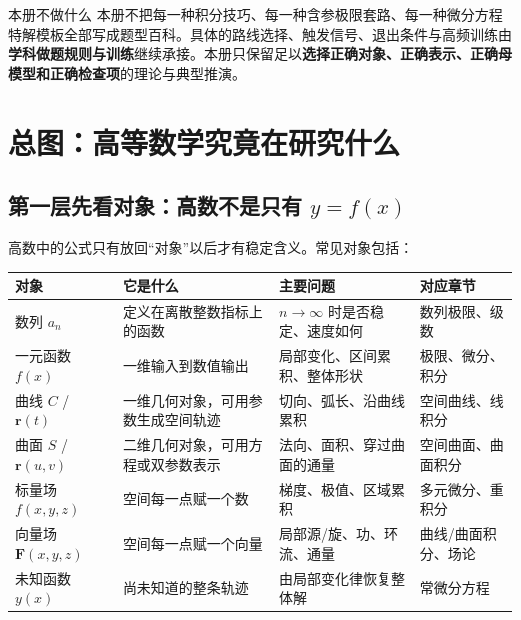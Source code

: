 \documentclass[11pt,a4paper,openany]{ctexbook}
\newcommand{\key}[1]{\textbf{\color{deep}#1}}
\begin{document}
\begin{warnbox}{本册不做什么}
本册不把每一种积分技巧、每一种含参极限套路、每一种微分方程特解模板全部写成题型百科。具体的路线选择、触发信号、退出条件与高频训练由\key{学科做题规则与训练}继续承接。本册只保留足以\key{选择正确对象、正确表示、正确母模型和正确检查项}的理论与典型推演。
\end{warnbox}

\tableofcontents
\mainmatter

\chapter{总图：高等数学究竟在研究什么}

\section{第一层先看对象：高数不是只有 \texorpdfstring{$y=f(x)$}{y=f(x)}}
高数中的公式只有放回“对象”以后才有稳定含义。常见对象包括：
\begin{longtable}{L{3.1cm}L{4.1cm}L{4.3cm}L{\dimexpr\linewidth-11.67cm\relax}}
\toprule
\textbf{对象} & \textbf{它是什么} & \textbf{主要问题} & \textbf{对应章节}\\
\midrule
数列 $a_n$ & 定义在离散整数指标上的函数 & $n\to\infty$ 时是否稳定、速度如何 & 数列极限、级数\\
一元函数 $f(x)$ & 一维输入到数值输出 & 局部变化、区间累积、整体形状 & 极限、微分、积分\\
曲线 $C$ / $\bm r(t)$ & 一维几何对象，可用参数生成空间轨迹 & 切向、弧长、沿曲线累积 & 空间曲线、线积分\\
曲面 $S$ / $\bm r(u,v)$ & 二维几何对象，可用方程或双参数表示 & 法向、面积、穿过曲面的通量 & 空间曲面、曲面积分\\
标量场 $f(x,y,z)$ & 空间每一点赋一个数 & 梯度、极值、区域累积 & 多元微分、重积分\\
向量场 $\bm F(x,y,z)$ & 空间每一点赋一个向量 & 局部源/旋、功、环流、通量 & 曲线/曲面积分、场论\\
未知函数 $y(x)$ & 尚未知道的整条轨迹 & 由局部变化律恢复整体解 & 常微分方程\\
\bottomrule
\end{longtable}
\end{document}
